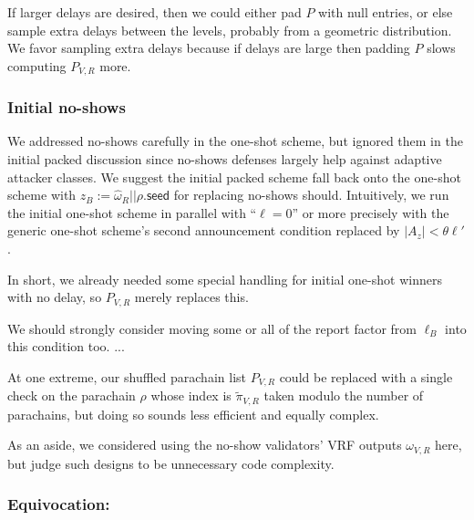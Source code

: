 If larger delays are desired, then we could either pad $P$ with null entries, or else sample extra delays between the levels, probably from a geometric distribution.  We favor sampling extra delays because if delays are large then padding $P$ slows computing $P_{V,R}$ more.

\subsubsection{Initial no-shows}

We addressed no-shows carefully in the one-shot scheme, but ignored them in the initial packed discussion since no-shows defenses largely help against adaptive attacker classes.  We suggest the initial packed scheme fall back onto the one-shot scheme with $z_B := \hat{\omega}_R || \rho.\mathsf{seed}$ for replacing no-shows should.  Intuitively, we run the initial one-shot scheme in parallel with ``$\ell = 0$'' or more precisely with the generic one-shot scheme's second announcement condition replaced by $|A_z| < \theta \ell'$.  

In short, we already needed some special handling for initial one-shot winners with no delay, so $P_{V,R}$ merely replaces this.

We should strongly consider moving some or all of the report factor from $\ell_B$ into this condition too.  ...

At one extreme, our shuffled parachain list $P_{V,R}$ could be replaced with a single check on the parachain $\rho$ whose index is $\tilde{\pi}_{V,R}$ taken modulo the number of parachains, but doing so sounds less efficient and equally complex.  

As an aside, we considered using the no-show validators' VRF outputs $\omega_{V,R}$ here, but judge such designs to be unnecessary code complexity. 

\subsubsection{Equivocation:}


